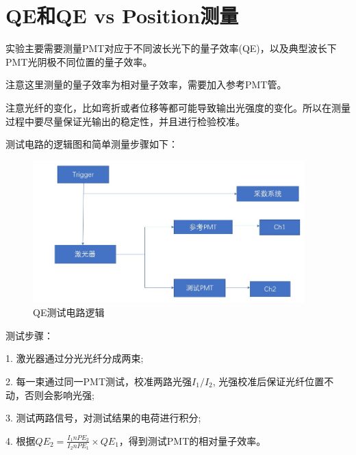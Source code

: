 \documentclass[UTF8,a4paper,12pt]{ctexart}
\begin{document}
\section{QE和QE vs Position测量}
实验主要需要测量PMT对应于不同波长光下的量子效率(QE)，以及典型波长下PMT光阴极不同位置的量子效率。\par
注意这里测量的量子效率为相对量子效率，需要加入参考PMT管。\par
注意光纤的变化，比如弯折或者位移等都可能导致输出光强度的变化。所以在测量过程中要尽量保证光输出的稳定性，并且进行检验校准。\par
测试电路的逻辑图和简单测量步骤如下：\par
\begin{figure}[H]
	\centering
	\includegraphics[width=0.8\linewidth,height=5.5cm]{QE测量逻辑.jpg}
	\caption[图5]{QE测试电路逻辑}
\end{figure}
测试步骤：\par
1. 激光器通过分光光纤分成两束;\par
2. 每一束通过同一PMT测试，校准两路光强$I_1/I_2$, 光强校准后保证光纤位置不动，否则会影响光强;\par
3. 测试两路信号，对测试结果的电荷进行积分;\par
4. 根据$QE_2=\frac{I_1nPE_2}{I_2nPE_1}\times QE_1$，得到测试PMT的相对量子效率。
\end{document}
